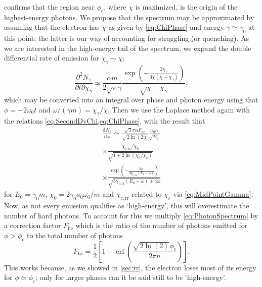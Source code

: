 \documentclass[reprint,superscriptaddress,amsmath,amssymb,aps,pra]{revtex4-1}
\newcommand{\rmd}{\mathrm{d}}
\newcommand{\lnTwo}{\ln(2)}
\DeclareMathOperator\erf{erf}
\newcommand{\chicrr}{\chi_{c,\mathrm{rr}}}
\begin{document}
 confirms that the region near $\phi_c$, where $\chi$ is maximized,
is the origin of the highest-energy photons. We propose that the spectrum may be
approximated by assuming that the electron has $\chi$ as given by \cref{eq:ChiPhase}
and energy $\gamma \simeq \gamma_0$ at this point; the latter is our way of accounting
for straggling (or quenching). As we are interested in the high-energy tail of the spectrum,
we expand the double differential rate of emission for $\chi_\gamma \sim \chi$:
	\begin{equation}
	\frac{\partial^2 N_\gamma}{\partial t \partial \chi_\gamma} \simeq
		\frac{\alpha m}{2 \sqrt{\pi} \gamma}
		\frac{\exp\!\left(-\frac{2 \chi_\gamma}{3\chi (\chi - \chi_\gamma)}\right)}
		{\sqrt{\chi - \chi_\gamma}},
	\end{equation}
which may be converted into an integral over phase and photon energy using that
$\phi = -2\omega_0t$ and $\omega/(\gamma m) = \chi_\gamma / \chi$. Then we use
the Laplace method again with the relations \cref{eq:SecondDvChi,eq:ChiPhase},
with the result that
	\begin{multline}
	\frac{\rmd N_\gamma}{\rmd \omega} \simeq
		\frac{\sqrt{3}\pi\alpha F_\text{he}}{\sqrt{2\lnTwo}}
		\frac{a_0 n}{\sqrt{E_0}}
	\\ \times
		\frac{\chicrr / \chi_0}
			{\sqrt{1 + 2\ln\!\left( \chi_0 / \chi_c \right)}}
	\\ \times
		\frac{\exp\!\left(
						-\frac{2 \omega}{3\chicrr(E_0 - \omega)}
					\right)}
			{\sqrt{3\chicrr (E_0 - \omega) + 4 \omega}}
	\label{eq:PhotonSpectrum}	
	\end{multline}
for $E_0 = \gamma_0 m$, $\chi_0 = 2 \gamma_0 a_0 \omega_0 / m$ and $\chicrr$
related to $\chi_c$ via \cref{eq:MidPointGamma}. Now, as not every emission
qualifies as `high-energy', this will overestimate the number of hard photons.
To account for this we multiply \cref{eq:PhotonSpectrum} by a correction
factor $F_\text{he}$ which is the ratio of the number of photons emitted
for $\phi > \phi_c$ to the total number of photons
	\begin{equation}
	F_\text{he} =
		\frac{1}{2}
		\left[
		1 - \erf\!\left( \frac{\sqrt{2\lnTwo}\phi_c}{2 \pi n} \right)
		\right].
	\label{eq:CorrectionFactor}
	\end{equation}
This works because, as we showed in \cref{sec:rr}, the electron
loses most of its energy for $\phi \simeq \phi_c$; only for larger phases can
it be said still to be `high-energy'.
\end{document}
